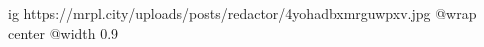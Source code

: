  
 
 
 
 

\ifcmt
  ig https://mrpl.city/uploads/posts/redactor/4yohadbxmrguwpxv.jpg
  @wrap center
  @width 0.9
\fi
